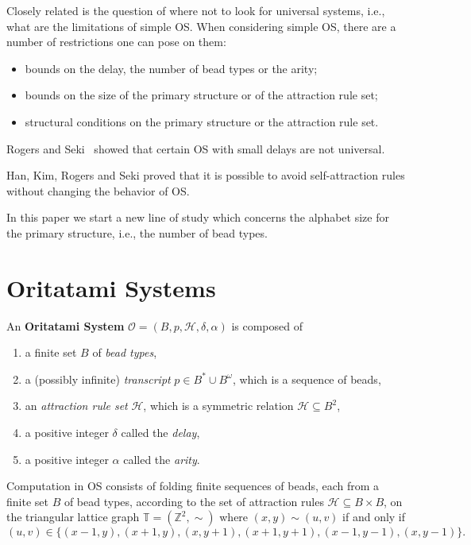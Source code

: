 \documentclass[]{llncs}
\newcommand{\ori}{\mathcal{O}}
\newcommand{\bond}{\mathcal{H}}
\begin{document}
Closely related is the question of where not to look for universal systems, i.e., what are the limitations of simple OS. When considering simple OS, there are a number of restrictions one can pose on them:
\begin{itemize}
\item bounds on the delay, the number of bead types or the arity;
\item bounds on the size of the primary structure or of the attraction rule set;
\item structural conditions on the primary structure or the attraction rule set.
\end{itemize}

Rogers and Seki~\cite{SimpleSim} showed that certain OS with small delays are not universal.

Han, Kim, Rogers and Seki\cite{SelfRemove} proved that it is possible to avoid self-attraction rules without changing the behavior of OS.

In this paper we start a new line of study which concerns the alphabet size for the primary structure, i.e., the number of bead types.

\pagebreak

\section{Oritatami Systems}
An \textbf{Oritatami System} $\ori = (B, p, \bond, \delta, \alpha)$ is composed of
\begin{enumerate}
\item a finite set $B$ of \textit{bead types},
\item a (possibly infinite) \textit{transcript} $p\in B^*\cup B^\omega$, which is a sequence of beads,
\item an \textit{attraction rule set} $\bond$, which is a symmetric relation $\bond\subseteq B^2$,
\item  a positive integer $\delta$ called the \textit{delay},
\item a positive integer $\alpha$ called the \textit{arity}.
\end{enumerate}

Computation in OS consists of folding finite sequences of beads, each from a finite set $B$ of bead types, according to the set of attraction rules $\bond \subseteq B\times B$, on the triangular lattice graph $\mathbb{T} = (\mathbb{Z}^2,\sim)$
where $(x, y) \sim (u, v)$ if and only if $$(u, v) \in \{(x-1, y), (x+1, y), (x, y+1), (x+1, y+1), (x-1, y-1), (x, y-1)\}.$$
\end{document}
